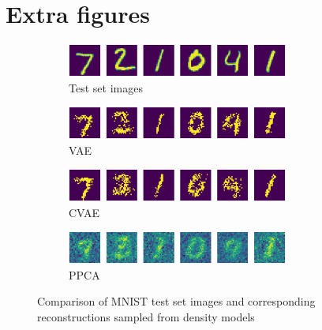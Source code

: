 \section{Extra figures}
\begin{figure}[!h]
	\begin{subfigure}[t]{1\textwidth}
		\centering
		\includegraphics[width = 0.8\textwidth]{figures/ppca/real}
		\caption{Test set images}
		\label{fig:ppca:real2}
	\end{subfigure}
	\begin{subfigure}[t]{1\textwidth}
		\centering
		\includegraphics[width = 0.8\textwidth]{figures/vae/sample}
		\caption{VAE}
		\label{fig:vae:recon}
	\end{subfigure}
	\begin{subfigure}[t]{1\textwidth}
		\centering
		\includegraphics[width = 0.8\textwidth]{figures/cvae/sample}
		\caption{CVAE}
		\label{fig:cvae:recon}
	\end{subfigure}
	\begin{subfigure}[t]{1\textwidth}
		\centering
		\includegraphics[width = 0.8\textwidth]{figures/ppca/sample}
		\caption{PPCA}
		\label{fig:ppca:recon}
	\end{subfigure}
	\caption{Comparison of MNIST test set images and corresponding reconstructions sampled from density models}
	\label{fig:mean:_v_real}
\end{figure}